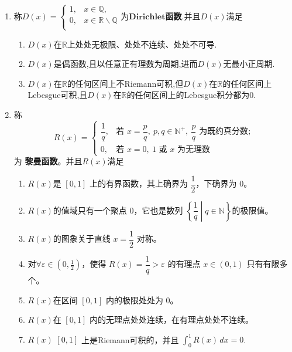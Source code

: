 \documentclass[../../main.tex]{subfiles}%
\begin{document}
\begin{theorem}[Dirichlet函数和Riemann函数的定义及其性质]\label{theorem:Dirichlet函数和Riemann函数的定义及其性质}
\begin{enumerate}
\item 称$D(x)=\begin{cases}
1,&x\in \mathbb{Q} ,\\
0,&x\in \mathbb{R} \backslash \mathbb{Q} \\
\end{cases}$为$\mathbf{Dirichlet}$\textbf{函数}.并且$D(x)$满足
\begin{enumerate}[(1)]
\item $D(x)$在$\mathbb{R}$上处处无极限、处处不连续、处处不可导.

\item $D(x)$是偶函数,且以任意正有理数为周期,进而$D(x)$无最小正周期.

\item $D(x)$在$\mathbb{R}$的任何区间上不Riemann可积,但$D(x)$在$\mathbb{R}$的任何区间上Lebesgue可积,且$D(x)$在$\mathbb{R}$的任何区间上的Lebesgue积分都为0.
\end{enumerate}

\item  称
\[
R(x) = 
\begin{cases}
\dfrac{1}{q}, & \text{若 } x = \dfrac{p}{q},\ p, q \in \mathbb{N}^+,\ \dfrac{p}{q} \text{ 为既约真分数}; \\[1em]
0, & \text{若 } x = 0,\ 1 \text{ 或 } x \text{ 为无理数}
\end{cases}
\]
为 \textbf{黎曼函数}。并且$R(x)$满足
\begin{enumerate}[(1)]
\item $R(x)$是 \([0,1]\) 上的有界函数，其上确界为 \(\dfrac{1}{2}\)，下确界为 \(0\)。
\item $R(x)$的值域只有一个聚点 \(0\)，它也是数列 \(\left\{\dfrac{1}{q}\middle| q\in\mathbb{N}\right\}\)的极限值。
\item $R(x)$的图象关于直线 \(x = \dfrac{1}{2}\) 对称。
\item 对\(\forall \varepsilon \in (0, \frac{1}{2})\)，使得 \(R(x) = \dfrac{1}{q} > \varepsilon\) 的有理点 \(x\in(0,1)\) 只有有限多个。
\item $R(x)$在区间 \([0,1]\) 内的极限处处为 \(0\)。
\item $R(x)$在 \([0,1]\) 内的无理点处处连续，在有理点处处不连续。
\item $R(x)$ \([0,1]\) 上是Riemann可积的，并且 \(\displaystyle\int_0^1 R(x)\,dx = 0\).
\end{enumerate}
\end{enumerate}
\end{theorem}
\end{document}
